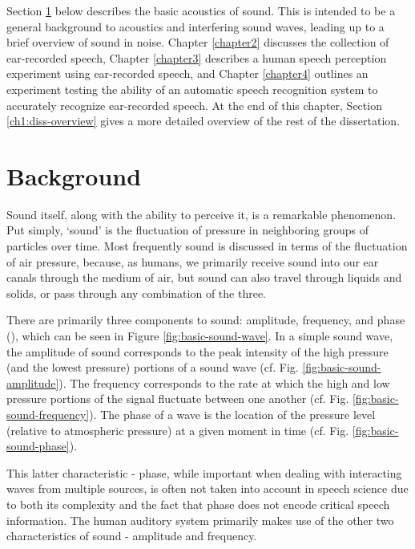 Section \ref{ch1:background} below describes the basic acoustics of sound.  This is intended to be a general background to acoustics and interfering sound waves, leading up to a brief overview of sound in noise. Chapter \ref{chapter2} discusses the collection of ear-recorded speech, Chapter \ref{chapter3} describes a human speech perception experiment using ear-recorded speech, and Chapter \ref{chapter4} outlines an experiment testing the ability of an automatic speech recognition system to accurately recognize ear-recorded speech.  At the end of this chapter, Section \ref{ch1:diss-overview} gives a more detailed overview of the rest of the dissertation.

\section{Background}\label{ch1:background}

Sound itself, along with the ability to perceive it, is a remarkable phenomenon.  Put simply, `sound' is the fluctuation of pressure in neighboring groups of particles over time. Most frequently sound is discussed in terms of the fluctuation of air pressure, because, as humans, we primarily receive sound into our ear canals through the medium of air, but sound can also travel through liquids and solids, or pass through any combination of the three.

There are primarily three components to sound: amplitude, frequency, and phase (\cite{rosen:91}), which can be seen in Figure \ref{fig:basic-sound-wave}.  In a simple sound wave, the amplitude of sound corresponds to the peak intensity of the high pressure (and the lowest pressure) portions of a sound wave (cf. Fig. \ref{fig:basic-sound-amplitude}).  The frequency corresponds to the rate at which the high and low pressure portions of the signal fluctuate between one another (cf. Fig. \ref{fig:basic-sound-frequency}).  The phase of a wave is the location of the pressure level (relative to atmospheric pressure) at a given moment in time (cf. Fig. \ref{fig:basic-sound-phase}).

This latter characteristic - phase, while important when dealing with interacting waves from multiple sources, is often not taken into account in speech science due to both its complexity and the fact that phase does not encode critical speech information.  The human auditory system primarily makes use of the other two characteristics of sound - amplitude and frequency.


